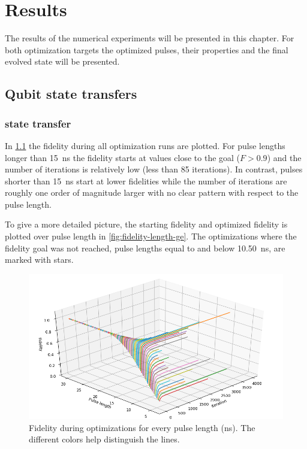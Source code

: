\documentclass[main.tex]{subfiles}
\begin{document}
\chapter{Results}
The results of the numerical experiments will be presented in this chapter.
For both optimization targets the optimized pulses, their properties and the final evolved state will be presented.


\section{Qubit state transfers}
\subsection{%
	\texorpdfstring{}{0 -> 1} state transfer
}
In \cref{fig:3d-optim-ge} the fidelity during all optimization runs are plotted.
For pulse lengths longer than \SI{15}{\nano\second} the fidelity starts at values close to the goal (\(F>0.9\)) and the number of iterations is relatively low (less than 85 iterations).
In contrast, pulses shorter than \SI{15}{\nano\second} start at lower fidelities while the number of iterations are roughly one order of magnitude larger with no clear pattern with respect to the pulse length.

To give a more detailed picture, the starting fidelity and optimized fidelity is plotted over pulse length in \cref{fig:fidelity-length-ge}.
The optimizations where the fidelity goal was not reached, pulse lengths equal to and below \SI{10.50}{\nano\second}, are marked with stars.

\begin{figure}[H]
    \centering
    \includegraphics[width=\linewidth]{figs/3d-optim-ge.png}
    \caption{Fidelity during optimizations for every pulse length (ns). The different colors help distinguish the lines.}\label{fig:3d-optim-ge}
\end{figure}
\end{document}
